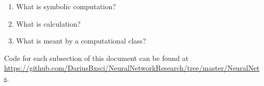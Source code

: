 \documentclass[./Research.tex]{subfiles}
\begin{document}
    \begin{enumerate}
        \item What is symbolic computation?
        \item What is calculation?
        \item What is meant by a computational class?
    \end{enumerate}
    
     Code for each subsection of this document can be found at \url{https://github.com/DariusBxsci/NeuralNetworkResearch/tree/master/NeuralNets}. 
\end{document}
